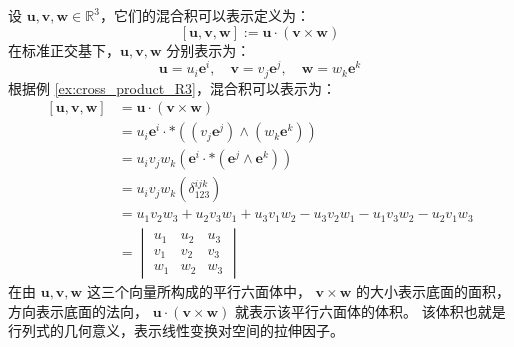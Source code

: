 \vspace{1em}
\begin{example}[向量的混合积与矩阵行列式的几何意义]
    设 $\mathbf{u},\mathbf{v},\mathbf{w}\in \mathbb{R}^3$，它们的混合积可以表示定义为：
    \[
        \left[\mathbf{u},\mathbf{v},\mathbf{w}\right] := \mathbf{u} \cdot (\mathbf{v} \times \mathbf{w})
    \]
    在标准正交基下，$\mathbf{u},\mathbf{v},\mathbf{w}$ 分别表示为：
    \[
        \mathbf{u} = u_i \mathbf{e}^i,\quad \mathbf{v} = v_j \mathbf{e}^j,\quad \mathbf{w} = w_k \mathbf{e}^k
    \]
    根据例 \ref{ex:cross_product_R3}，混合积可以表示为：
    \begin{align*}
        \left[\mathbf{u},\mathbf{v},\mathbf{w}\right] &= \mathbf{u} \cdot (\mathbf{v} \times \mathbf{w}) \\
        &= u_i \mathbf{e}^i \cdot *( (v_j \mathbf{e}^j) \wedge (w_k \mathbf{e}^k) ) \\
        &= u_i v_j w_k (\mathbf{e}^i \cdot *(\mathbf{e}^j \wedge \mathbf{e}^k)) \\
        &= u_i v_j w_k (\delta^{ijk}_{123})\\
        &= u_1 v_2 w_3 + u_2 v_3 w_1 + u_3 v_1 w_2 - u_3 v_2 w_1 - u_1 v_3 w_2 - u_2 v_1 w_3 \\
        &= \begin{vmatrix}
            u_1 & u_2 & u_3\\
            v_1 & v_2 & v_3\\
            w_1 & w_2 & w_3
        \end{vmatrix}
    \end{align*}
    在由 $\mathbf{u},\mathbf{v},\mathbf{w}$ 这三个向量所构成的平行六面体中，
    $\mathbf{v} \times \mathbf{w}$ 的大小表示底面的面积，方向表示底面的法向，
    $\mathbf{u} \cdot (\mathbf{v} \times \mathbf{w})$ 就表示该平行六面体的体积。
    该体积也就是行列式的几何意义，表示线性变换对空间的拉伸因子。
    \label{ex:triple_product_and_determinant}
\end{example}



\newpage

